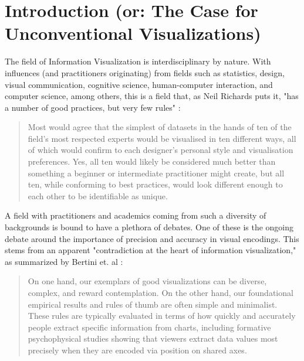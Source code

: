 \documentclass[manuscript, screen]{timtm}
\begin{document}
\setcounter{page}{1}

\maketitle

\section{Introduction (or: The Case for Unconventional Visualizations)}

The field of Information Visualization is interdisciplinary by nature. With influences (and practitioners originating) from fields such as statistics, design, visual communication, cognitive science, human-computer interaction, and computer science, among others, this is a field that, as Neil Richards puts it, "has a number of good practices, but very few rules" \cite{richards2022questions}:

\begin{quote}
    Most would agree that the simplest of datasets in the hands of ten of the field’s most respected experts would be visualised in ten different ways, all of which would confirm to each designer’s personal style and visualisation preferences. Yes, all ten would likely be considered much better than something a beginner or intermediate practitioner might create, but all ten, while conforming to best practices, would look different enough to each other to be identifiable as unique.
\end{quote}

A field with practitioners and academics coming from such a diversity of backgrounds is bound to have a plethora of debates. One of these is the ongoing debate around the importance of precision and accuracy in visual encodings. This stems from an apparent "contradiction at the heart of information visualization," as summarized by Bertini et. al \cite{BertiniEnrico2021WSAC}:

\begin{quote}
    On one hand, our exemplars of good visualizations can be diverse, complex, and reward contemplation. On the other hand, our foundational empirical results and rules of thumb are often simple and minimalist. These rules are typically evaluated in terms of how quickly and accurately people extract specific information from charts, including formative psychophysical studies showing that viewers extract data values most precisely when they are encoded via position on shared axes.
\end{quote}
\end{document}
